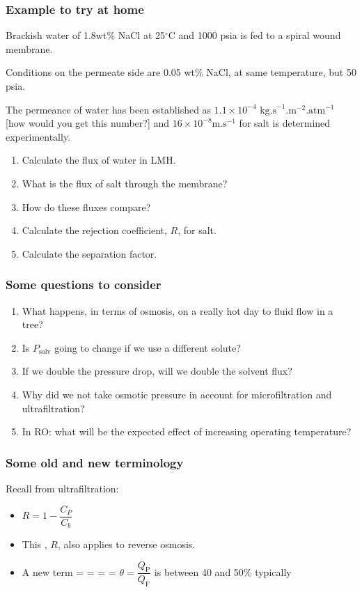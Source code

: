 \begin{frame}\frametitle{Example to try at home}
	Brackish water of 1.8wt\% NaCl at 25$^{\circ}\text{C}$ and 1000 psia is fed to a spiral wound membrane.

	\vspace{6pt}
	Conditions on the permeate side are 0.05 wt\% NaCl, at same temperature, but 50 psia.

	\vspace{6pt}
	The permeance of water has been established as $1.1 \times 10^{-4} \text{~kg.s}^{-1}\text{.m}^{-2}\text{.atm}^{-1}$ [how would you get this number?] and $16 \times 10^{-8} \text{m.s}^{-1}$ for salt is determined experimentally.

	\begin{enumerate}
		\item	Calculate the flux of water in LMH.
		\item	What is the flux of salt through the membrane?
		\item	How do these fluxes compare?
		\item	Calculate the rejection coefficient, $R$, for salt.
		\item	Calculate the separation factor.
	\end{enumerate}
\end{frame}

\begin{frame}\frametitle{Some questions to consider}
	\begin{enumerate}
		\item	What happens, in terms of osmosis, on a really hot day to fluid flow in a tree?
		\item	Is $P_\text{solv}$ going to change if we use a different solute?
		\item	If we double the pressure drop, will we double the solvent flux?
		\item	Why did we not take osmotic pressure in account for microfiltration and ultrafiltration?
		\item	In RO: what will be the expected effect of increasing operating temperature?
	\end{enumerate}
\end{frame}

\begin{frame}\frametitle{Some old and new terminology}
	Recall from ultrafiltration:
	\begin{itemize}
		\item	$R = 1 - \dfrac{C_P}{C_b}$

		\item	This {\color{purple}{rejection coefficient}}, $R$, also applies to reverse osmosis.

		\item	A new term = {\color{purple}{cut}} = {\color{purple}{conversion}} = {\color{purple}{recovery}} = $\theta = \dfrac{Q_\text{P}}{Q_\text{F}}$ is between 40 and 50\% typically
	\end{itemize}
\end{frame}

